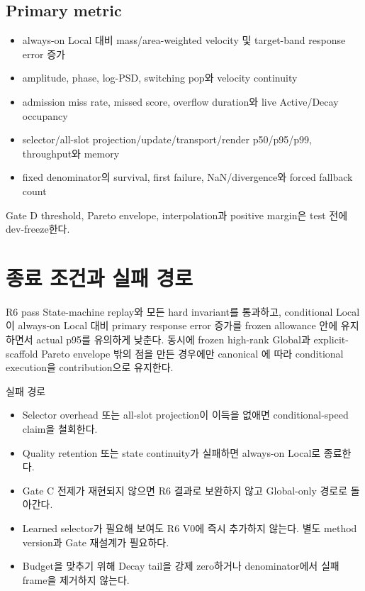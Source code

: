 \documentclass[10pt]{article}
\begin{document}
\subsection{Primary metric}

\begin{itemize}
  \item always-on Local 대비 mass/area-weighted velocity 및 target-band response error 증가
  \item amplitude, phase, log-PSD, switching pop와 velocity continuity
  \item admission miss rate, missed score, overflow duration와 live Active/Decay occupancy
  \item selector/all-slot projection/update/transport/render p50/p95/p99, throughput와 memory
  \item fixed denominator의 survival, first failure, NaN/divergence와 forced fallback count
\end{itemize}

Gate D threshold, Pareto envelope, interpolation과 positive margin은 test 전에 dev-freeze한다.

\section{종료 조건과 실패 경로}
\label{sec:r6-chapter-8}

\begin{contractbox}{R6 pass}
State-machine replay와 모든 hard invariant를 통과하고, conditional Local이 always-on Local 대비
primary response error 증가를 frozen allowance 안에 유지하면서 actual p95를 유의하게 낮춘다.
동시에 frozen high-rank Global과 explicit-scaffold Pareto envelope 밖의 점을 만든 경우에만
canonical 에 따라 conditional execution을 contribution으로 유지한다.
\end{contractbox}

\begin{stopbox}{실패 경로}
\begin{itemize}
  \item Selector overhead 또는 all-slot projection이 이득을 없애면 conditional-speed claim을 철회한다.
  \item Quality retention 또는 state continuity가 실패하면 always-on Local로 종료한다.
  \item Gate C 전제가 재현되지 않으면 R6 결과로 보완하지 않고 Global-only 경로로 돌아간다.
  \item Learned selector가 필요해 보여도 R6 V0에 즉시 추가하지 않는다. 별도 method version과 Gate 재설계가 필요하다.
  \item Budget을 맞추기 위해 Decay tail을 강제 zero하거나 denominator에서 실패 frame을 제거하지 않는다.
\end{itemize}
\end{stopbox}
\end{document}
